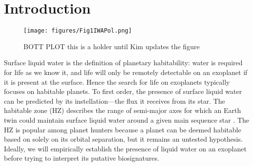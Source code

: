 \documentclass[
    usenatbib,
]{mnras}
\begin{document}
\section{Introduction}
\label{sec:intro}

\begin{figure*}%
   \centering
   \texttt{[image: figures/Fig1IWAPol.png]}
   \caption{BOTT PLOT this is a holder until Kim updates the figure}
    \label{fig:bottplot}
\end{figure*}



Surface liquid water is the definition of planetary habitability: water is required for life as we know it, and life will only be remotely detectable on an exoplanet if it is present at the surface. Hence the search for life on exoplanets typically focuses on habitable planets. To first order, the presence of surface liquid water can be predicted by its instellation---the flux it receives from its star. The habitable zone (HZ) describes the range of semi-major axes for which an Earth twin could maintain surface liquid water around a given main sequence star \cite{kasting93}.  The HZ is popular among planet hunters because a planet can be deemed habitable based on solely on its orbital separation, but it remains an untested hypothesis. Ideally, we will empirically establish the presence of liquid water on an exoplanet before trying to interpret its putative biosignatures.    
\end{document}
